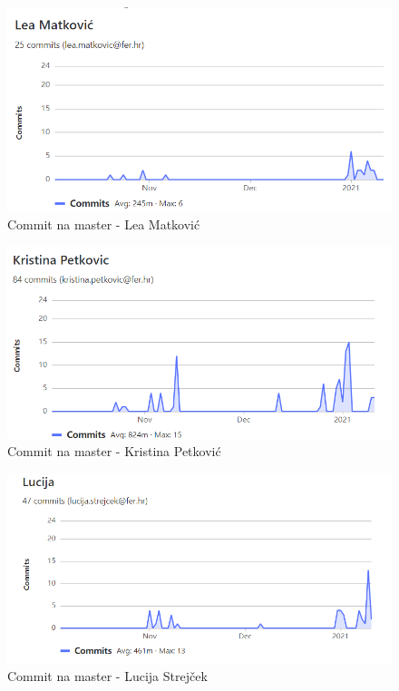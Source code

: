 		\begin{figure}[H]
			\includegraphics[width=1\linewidth]{images/lm-git.png}
			\caption{Commit na master - Lea Matković}
			\label{fig:Lea Matković - git} 
		\end{figure}
		
		\begin{figure}[H]
			\includegraphics[width=1\linewidth]{images/kp-git.png}
			\caption{Commit na master - Kristina Petković}
			\label{fig:Kristina Petković - git} 
		\end{figure}
		
		\begin{figure}[H]
			\includegraphics[width=1\linewidth]{images/ls-git1.png}
			\caption{Commit na master - Lucija Strejček}
			\label{fig:Lucija Strejček - git} 
		\end{figure}
		
	